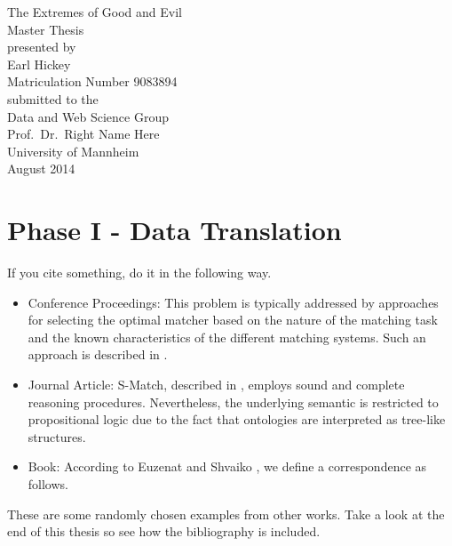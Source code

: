 \documentclass[11pt,titlepage,oneside,openany]{book}
\begin{document}
\begin{titlepage}
	\vspace*{2cm}
  \begin{center}
   {\Large The Extremes of Good and Evil\\}
   \vspace{2cm} 
   {Master Thesis\\}
   \vspace{2cm}
   {presented by\\
    Earl Hickey \\
    Matriculation Number 9083894\\
   }
   \vspace{1cm} 
   {submitted to the\\
    Data and Web Science Group\\
    Prof.\ Dr.\ Right Name Here\\
    University of Mannheim\\} \vspace{2cm}
   {August 2014}
  \end{center}
\end{titlepage} 

\tableofcontents
\newpage

\listoffigures

\listoftables


\newpage



\chapter{Phase I - Data Translation}
\label{cha:data-translation}



If you cite something, do it in the following way. 
\begin{itemize}
	\item Conference Proceedings: This problem is typically addressed by approaches for selecting the optimal matcher based on the nature of the matching task and the known characteristics of the different matching systems. Such an approach is described in \cite{mochol08matcher}.
	\item Journal Article: S-Match, described in \cite{giunchiglia2008semanticmatching}, employs sound and complete reasoning procedures. Nevertheless, the underlying semantic is restricted to propositional logic due to the fact that ontologies are interpreted as tree-like structures.
	\item Book: According to Euzenat and Shvaiko \cite{euzenat07matcherbook}, we define a correspondence as follows.
\end{itemize}
These are some randomly chosen examples from other works. Take a look at the end of this thesis so see how the bibliography is included.
\end{document}
